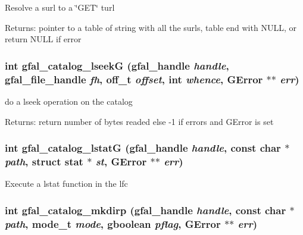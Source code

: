 Resolve a surl to a \char`\"{}GET\char`\"{} turl \begin{Desc}
\item[Returns:]pointer to a table of string with all the surls, table end with NULL, or return NULL if error \end{Desc}
\subsubsection{\setlength{\rightskip}{0pt plus 5cm}int gfal\_\-catalog\_\-lseek\-G (gfal\_\-handle {\em handle}, gfal\_\-file\_\-handle {\em fh}, off\_\-t {\em offset}, int {\em whence}, GError $\ast$$\ast$ {\em err})}\label{gfal__common__catalog_8h_f401436fd332c96ff3f9562d4e8be903}


do a lseek operation on the catalog \begin{Desc}
\item[Returns:]return number of bytes readed else -1 if errors and GError is set \end{Desc}
\subsubsection{\setlength{\rightskip}{0pt plus 5cm}int gfal\_\-catalog\_\-lstat\-G (gfal\_\-handle {\em handle}, const char $\ast$ {\em path}, struct stat $\ast$ {\em st}, GError $\ast$$\ast$ {\em err})}\label{gfal__common__catalog_8h_1ad1b1f96272dbf43a15e7ea5d35389d}


Execute a lstat function in the lfc 
\subsubsection{\setlength{\rightskip}{0pt plus 5cm}int gfal\_\-catalog\_\-mkdirp (gfal\_\-handle {\em handle}, const char $\ast$ {\em path}, mode\_\-t {\em mode}, gboolean {\em pflag}, GError $\ast$$\ast$ {\em err})}\label{gfal__common__catalog_8h_93da9b37bece0b034d80c17131761110}


